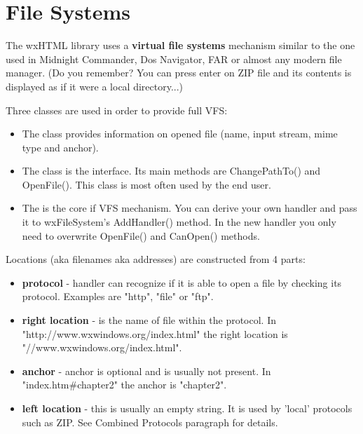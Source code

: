 \section{File Systems}\label{fs}

The wxHTML library uses a {\bf virtual file systems} mechanism
similar to the one used in Midnight Commander, Dos Navigator,
FAR or almost any modern file manager. (Do you remember? You can
press enter on ZIP file and its contents is displayed as if it
were a local directory...)


Three classes are used in order to provide full VFS:

\begin{itemize}\itemsep=0pt
\item The  class provides information
on opened file (name, input stream, mime type and anchor).
\item The  class is the interface.
Its main methods are ChangePathTo() and OpenFile(). This class
is most often used by the end user.
\item The  is the core
if VFS mechanism. You can derive your own handler and pass it to
wxFileSystem's AddHandler() method. In the new handler you only need to
overwrite OpenFile() and CanOpen() methods.
\end{itemize}


Locations (aka filenames aka addresses) are constructed from 4 parts:

\begin{itemize}\itemsep=0pt
\item {\bf protocol} - handler can recognize if it is able to open a
file by checking its protocol. Examples are "http", "file" or "ftp".
\item {\bf right location} - is the name of file within the protocol.
In "http://www.wxwindows.org/index.html" the right location is "//www.wxwindows.org/index.html".
\item {\bf anchor} - anchor is optional and is usually not present.
In "index.htm\#chapter2" the anchor is "chapter2".
\item {\bf left location} - this is usually an empty string. 
It is used by 'local' protocols such as ZIP.
See Combined Protocols paragraph for details.
\end{itemize}

